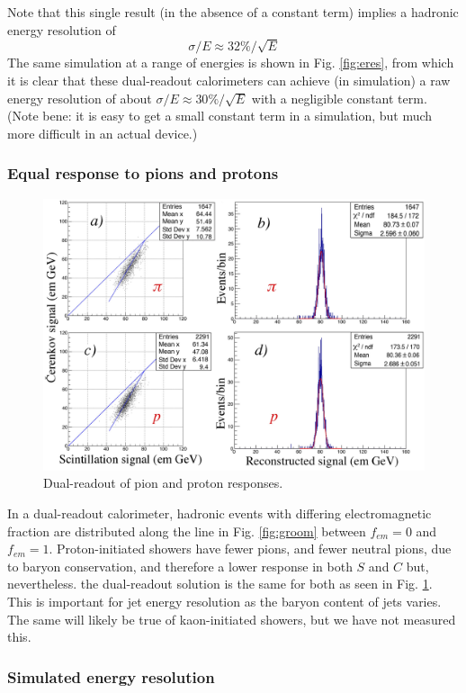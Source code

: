 Note that this single result (in the absence of a constant term) implies a hadronic energy resolution of
\begin{displaymath}
  \sigma / E \approx 32\% / \sqrt{E}
\end{displaymath}
The same simulation at a range of energies is shown in Fig. \ref{fig:eres}, from which it is clear that these dual-readout calorimeters can achieve (in simulation) a raw energy resolution of about $\sigma/E \approx 30\% / \sqrt{E}$ with a negligible constant term.  (Note bene:  it is easy to get a small constant term in a simulation, but much more difficult in an actual device.)


\subsubsection{Equal response to pions and protons}
\label{sec:pi-p}

\begin{figure}
 \centering
 \includegraphics[width=.5\linewidth]{Calorimeter/DualReadout/f42-pion-proton.jpg}
 \caption{Dual-readout of pion and proton responses.}
 \label{fig:pi-p}
\end{figure}

In a dual-readout calorimeter, hadronic events with differing
electromagnetic fraction are distributed along the line in Fig. \ref{fig:groom} between $f_{em}=0$ and $f_{em}=1$.  Proton-initiated
showers have fewer pions, and  fewer neutral pions, due to baryon conservation, and  therefore a lower response in both $S$ and $C$ but,
nevertheless. the dual-readout solution is the same for both as seen in Fig. \ref{fig:pi-p}.  This is important for jet energy resolution as the baryon  
content of jets varies.  The same will likely be true of kaon-initiated showers, but we have not measured this. 

\subsubsection{Simulated energy resolution}
\label{sec:Eres}  

